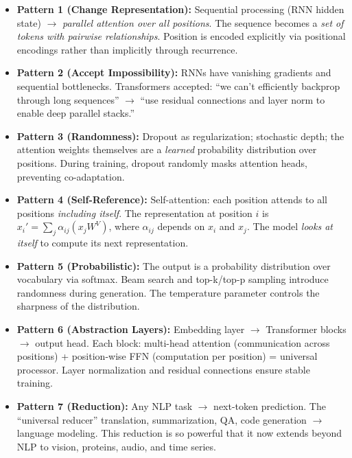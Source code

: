 \begin{itemize}
\item \textbf{Pattern 1 (Change Representation):} Sequential processing (RNN hidden state) $\to$ \emph{parallel attention over all positions}. The sequence becomes a \emph{set of tokens with pairwise relationships}. Position is encoded explicitly via positional encodings rather than implicitly through recurrence.

\item \textbf{Pattern 2 (Accept Impossibility):} RNNs have vanishing gradients and sequential bottlenecks. Transformers accepted: ``we can't efficiently backprop through long sequences'' $\to$ ``use residual connections and layer norm to enable deep parallel stacks.''

\item \textbf{Pattern 3 (Randomness):} Dropout as regularization; stochastic depth; the attention weights themselves are a \emph{learned} probability distribution over positions. During training, dropout randomly masks attention heads, preventing co-adaptation.

\item \textbf{Pattern 4 (Self-Reference):} Self-attention: each position attends to all positions \emph{including itself}. The representation at position $i$ is $x_i' = \sum_j \alpha_{ij}(x_j W^V)$, where $\alpha_{ij}$ depends on $x_i$ and $x_j$. The model \emph{looks at itself} to compute its next representation.

\item \textbf{Pattern 5 (Probabilistic):} The output is a probability distribution over vocabulary via softmax. Beam search and top-k/top-p sampling introduce randomness during generation. The temperature parameter controls the sharpness of the distribution.

\item \textbf{Pattern 6 (Abstraction Layers):} Embedding layer $\to$ Transformer blocks $\to$ output head. Each block: multi-head attention (communication across positions) + position-wise FFN (computation per position) = universal processor. Layer normalization and residual connections ensure stable training.

\item \textbf{Pattern 7 (Reduction):} Any NLP task $\to$ next-token prediction. The ``universal reducer'' translation, summarization, QA, code generation $\to$ language modeling. This reduction is so powerful that it now extends beyond NLP to vision, proteins, audio, and time series.


\end{itemize}
